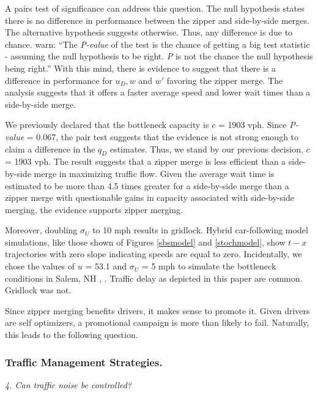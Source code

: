 \documentclass[Proceedings]{ascelike}
\begin{document}
A pairs test of significance can address this question. The null hypothesis states there is no difference in performance between the zipper and side-by-side merges. The alternative hypothesis suggests otherwise. Thus, any difference is due to chance.  warn: ``The \emph{P-value} of the test is the chance of getting a big test statistic - assuming the null hypothesis to be right. \emph{P} is not the chance the null hypothesis being right.'' With this mind, there is evidence to suggest that there is a difference in performance for $u_D, w$ and $w'$ favoring the zipper merge. The analysis suggests that it offers a faster average speed and lower wait times than a side-by-side merge. 

We previously declared that the bottleneck capacity is $c$ = 1903 vph. Since \emph{P-value} = 0.067, the pair test suggests that the evidence is not strong enough to claim a difference in the $q_D$ estimates. Thus, we stand by our previous decision, $c$ = 1903 vph. The result suggests that a zipper merge is less efficient than a side-by-side merge in maximizing traffic flow. Given the average wait time is estimated to be more than 4.5 times greater for a side-by-side merge than a zipper merge with questionable gains in capacity associated with side-by-side merging, the evidence supports zipper merging.

Moreover, doubling $\sigma_U$ to 10 mph results in gridlock. Hybrid car-following model simulations, like those shown of Figures \ref{sbsmodel}  and \ref{stochmodel}, show $t-x$ trajectories with zero slope indicating speeds are equal to zero. Incidentally, we chose the values of $u$ = 53.1 and  $\sigma_U$ = 5 mph to  simulate the bottleneck conditions in Salem, NH \cite{Laflamme2017}, \cite{Laflamme2018a}. Traffic delay as depicted in this paper are common. Gridlock was not.

 Since zipper merging benefits drivers, it makes sense to promote it. Given drivers are self optimizers, a promotional campaign is more than likely to fail. Naturally, this leads to the following question.
 
\subsubsection{Traffic Management Strategies.}

\noindent \emph{4. Can traffic noise be controlled?}
\end{document}
